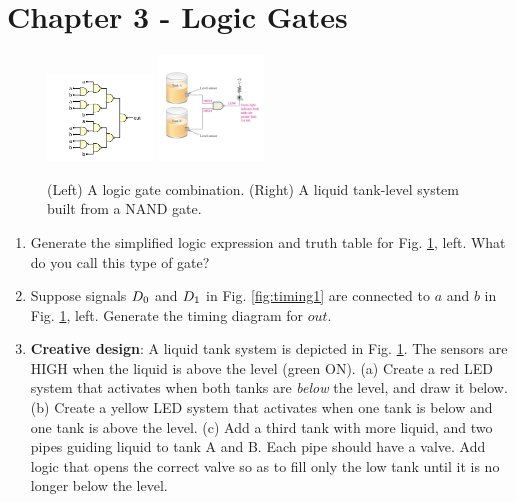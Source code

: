 \documentclass[10pt]{article}
\begin{document}
\section{Chapter 3 - Logic Gates}
\begin{figure}[ht]
\centering
\includegraphics[width=0.25\textwidth]{gateExample5.pdf}
\includegraphics[width=0.25\textwidth]{gateExample6.pdf}
\caption{\label{fig:gates1} (Left) A logic gate combination.  (Right) A liquid tank-level system built from a NAND gate.}
\end{figure}
\begin{enumerate}
\item Generate the simplified logic expression and truth table for Fig. \ref{fig:gates1}, left.  What do you call this type of gate? \\ \vspace{1cm}
\item Suppose signals $D_{\rm 0}$ and $D_{\rm 1}$ in Fig. \ref{fig:timing1} are connected to $a$ and $b$ in Fig. \ref{fig:gates1}, left.  Generate the timing diagram for $out$. \\ \vspace{0.75cm}
\item \textbf{Creative design}: A liquid tank system is depicted in Fig. \ref{fig:gates1}.  The sensors are HIGH when the liquid is above the level (green ON).  (a) Create a red LED system that activates when both tanks are \textit{below} the level, and draw it below.  (b) Create a yellow LED system that activates when one tank is below and one tank is above the level.  (c) Add a third tank with more liquid, and two pipes guiding liquid to tank A and B.  Each pipe should have a valve.  Add logic that opens the correct valve so as to fill only the low tank until it is no longer below the level.  \\ \vspace{1cm}
\end{enumerate}
\end{document}
